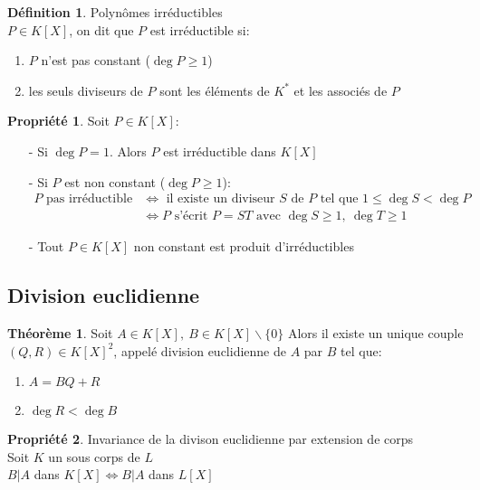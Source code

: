 \documentclass[fleqn]{article}
\theoremstyle{definition} \newtheorem*{defi}{D\'efinition}
\theoremstyle{definition} \newtheorem*{theo}{Th\'eor\`eme}
\theoremstyle{definition} \newtheorem*{coro}{Corollaire}
\theoremstyle{definition} \newtheorem*{nota}{Notation}
\theoremstyle{remark} \newtheorem*{rqs}{Remarques}
\theoremstyle{definition} \newtheorem*{prop}{Propri\'et\'e}
\begin{document}
\begin{defi} Polyn\^omes irr\'eductibles \\
	$P \in K[X]$, on dit que $P$ est irr\'eductible si:
	\begin{enumerate}
		\item $P$ n'est pas constant ($\deg P \geq 1$)
		\item les seuls diviseurs de $P$ sont les \'el\'ements de $K^*$ et les associ\'es de $P$
	\end{enumerate}
\end{defi}

\begin{prop} Soit $P \in K[X]$:
	\begin{itemize}
		\item [-] Si $\deg P = 1$. Alors $P$ est irr\'eductible dans $K[X]$
		\item [-] Si $P$ est non constant ($\deg P \geq 1$):
			\begin{align*} P \text{ pas irr\'eductible } &\Leftrightarrow \text{ il existe un diviseur } S \text{ de } P \text{ tel que }
			 1 \leq \deg S < \deg P \\
			&\Leftrightarrow P \text{ s'\'ecrit } P = ST \text{ avec } \deg S \geq 1,\ \deg T \geq 1 \end{align*}
		\item [-] Tout $P \in K[X]$ non constant est produit d'irr\'eductibles
	\end{itemize}
\end{prop}

\subsection{Division euclidienne}
\begin{theo} Soit $A \in K[X],\ B \in K[X]\backslash \{0\}$
	Alors il existe un unique couple $(Q,R) \in K[X]^2$, appel\'e division euclidienne de $A$ par $B$ tel que:
	\begin{enumerate}
		\item $A = BQ + R$
		\item $\deg R < \deg B$
	\end{enumerate}
\end{theo}

\begin{prop} Invariance de la divison euclidienne par extension de corps \\
	Soit $K$ un sous corps de $L$ \\
	$B | A$ dans $K[X] \Leftrightarrow B | A$ dans $L[X]$
\end{prop}
\end{document}
